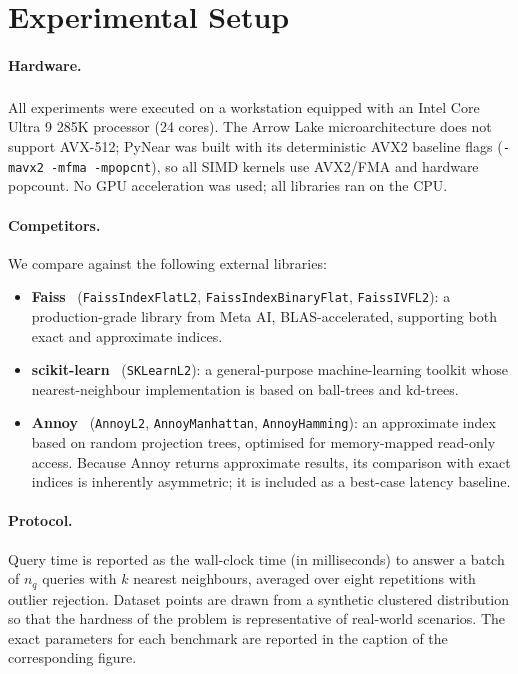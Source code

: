 \documentclass[11pt,a4paper]{article}
\begin{document}
\section{Experimental Setup}
\label{sec:setup}

\paragraph{Hardware.}
All experiments were executed on a workstation equipped with an
Intel\textsuperscript{\textregistered} Core\textsuperscript{\texttrademark}
Ultra 9 285K processor (24 cores).  The Arrow Lake microarchitecture does
not support AVX-512; PyNear was built with its deterministic AVX2 baseline
flags (\texttt{-mavx2 -mfma -mpopcnt}), so all SIMD kernels use AVX2/FMA and
hardware popcount.  No GPU acceleration was used; all libraries ran on the
CPU.

\paragraph{Competitors.}
We compare against the following external libraries:
\begin{itemize}
  \item \textbf{Faiss}~\cite{johnson2019billion} (\texttt{FaissIndexFlatL2},
        \texttt{FaissIndexBinaryFlat}, \texttt{FaissIVFL2}): a production-grade
        library from Meta AI, BLAS-accelerated, supporting both exact and
        approximate indices.
  \item \textbf{scikit-learn}~\cite{pedregosa2011scikit} (\texttt{SKLearnL2}):
        a general-purpose machine-learning toolkit whose nearest-neighbour
        implementation is based on ball-trees and kd-trees.
  \item \textbf{Annoy}~\cite{bernhardsson2018annoy} (\texttt{AnnoyL2},
        \texttt{AnnoyManhattan}, \texttt{AnnoyHamming}): an approximate index
        based on random projection trees, optimised for memory-mapped
        read-only access.  Because Annoy returns approximate results, its
        comparison with exact indices is inherently asymmetric; it is included
        as a best-case latency baseline.
\end{itemize}

\paragraph{Protocol.}
Query time is reported as the wall-clock time (in milliseconds) to answer a
batch of $n_q$ queries with $k$ nearest neighbours, averaged over eight
repetitions with outlier rejection.  Dataset points are drawn from a
synthetic clustered distribution so that the hardness of the problem is
representative of real-world scenarios.  The exact parameters for each
benchmark are reported in the caption of the corresponding figure.
\end{document}
